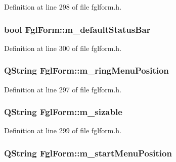 Definition at line 298 of file fglform.h.

\hypertarget{classFglForm_a2e877386e4ba441d929c0c35d48620cb}{
\subsubsection[{m\_\-defaultStatusBar}]{\setlength{\rightskip}{0pt plus 5cm}bool {\bf FglForm::m\_\-defaultStatusBar}}}
\label{classFglForm_a2e877386e4ba441d929c0c35d48620cb}


Definition at line 300 of file fglform.h.

\hypertarget{classFglForm_a25371a3df6cb3e1dc66e141bb2a9dff1}{
\subsubsection[{m\_\-ringMenuPosition}]{\setlength{\rightskip}{0pt plus 5cm}QString {\bf FglForm::m\_\-ringMenuPosition}}}
\label{classFglForm_a25371a3df6cb3e1dc66e141bb2a9dff1}


Definition at line 297 of file fglform.h.

\hypertarget{classFglForm_a7861c07caeb306c5ae9f2012ce73bff7}{
\subsubsection[{m\_\-sizable}]{\setlength{\rightskip}{0pt plus 5cm}QString {\bf FglForm::m\_\-sizable}}}
\label{classFglForm_a7861c07caeb306c5ae9f2012ce73bff7}


Definition at line 299 of file fglform.h.

\hypertarget{classFglForm_a94e20a9c06c349d6e7c5ec47c03de4a6}{
\subsubsection[{m\_\-startMenuPosition}]{\setlength{\rightskip}{0pt plus 5cm}QString {\bf FglForm::m\_\-startMenuPosition}}}
\label{classFglForm_a94e20a9c06c349d6e7c5ec47c03de4a6}


